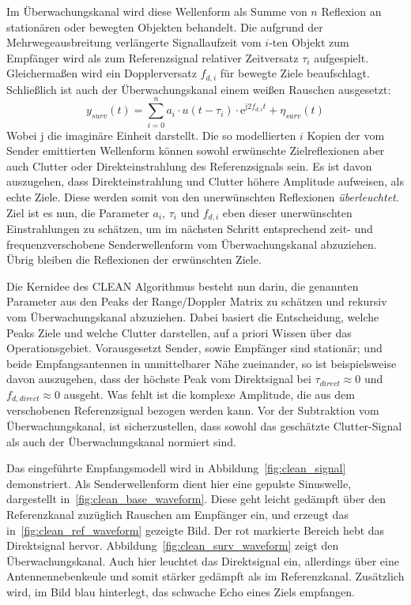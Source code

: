 Im Überwachungskanal wird diese Wellenform als Summe von \(n\) Reflexion an stationären oder bewegten Objekten behandelt. Die aufgrund der Mehrwegeausbreitung verlängerte Signallaufzeit vom \(i\)-ten Objekt zum Empfänger wird als zum Referenzsignal relativer Zeitversatz \(\tau_{i} \) aufgespielt. Gleichermaßen wird ein Dopplerversatz \(f_{d,i}\) für bewegte Ziele beaufschlagt. Schließlich ist auch der Überwachungskanal einem weißen Rauschen ausgesetzt:%
%
\begin{equation}
    y_{surv} (t) = \sum_{i = 0}^{n}{a_{i} \cdot u (t - \tau_{i}) \cdot \mathrm{e}^{\mathrm{j} 2 f_{d,i} t}} + \eta_{surv} (t)
\end{equation}%
%
Wobei \(\mathrm{j}\) die imaginäre Einheit darstellt. Die so modellierten \(i\) Kopien der vom Sender emittierten Wellenform können sowohl erwünschte Zielreflexionen aber auch Clutter oder Direkteinstrahlung des Referenzsignals sein. Es ist davon auszugehen, dass Direkteinstrahlung und Clutter höhere Amplitude aufweisen, als echte Ziele. Diese werden somit von den unerwünschten Reflexionen \emph{überleuchtet}. Ziel ist es nun, die Parameter \(a_{i}\), \(\tau_{i}\) und \(f_{d,i}\) eben dieser unerwünschten Einstrahlungen zu schätzen, um im nächsten Schritt entsprechend zeit- und frequenzverschobene Senderwellenform vom Überwachungskanal abzuziehen. Übrig bleiben die Reflexionen der erwünschten Ziele.

Die Kernidee des CLEAN Algorithmus besteht nun darin, die genannten Parameter aus den Peaks der Range/Doppler Matrix zu schätzen und rekursiv vom Überwachungskanal abzuziehen. Dabei basiert die Entscheidung, welche Peaks Ziele und welche Clutter darstellen, auf a priori Wissen über das Operationsgebiet. Vorausgesetzt Sender, sowie Empfänger sind stationär; und beide Empfangsantennen in unmittelbarer Nähe zueinander, so ist beispielsweise davon auszugehen, dass der höchste Peak vom Direktsignal bei \(\tau_{direct} \approx 0\) und \(f_{d,direct} \approx 0\) ausgeht. Was fehlt ist die komplexe Amplitude, die aus dem verschobenen Referenzsignal bezogen werden kann. Vor der Subtraktion vom Überwachungskanal, ist sicherzustellen, dass sowohl das geschätzte Clutter-Signal als auch der Überwachungskanal normiert sind.

Das eingeführte Empfangsmodell wird in Abbildung~\ref{fig:clean_signal} demonstriert. Als Senderwellenform dient hier eine gepulste Sinuswelle, dargestellt in~\ref{fig:clean_base_waveform}. Diese geht leicht gedämpft über den Referenzkanal zuzüglich Rauschen am Empfänger ein, und erzeugt das in~\ref{fig:clean_ref_waveform} gezeigte Bild. Der rot markierte Bereich hebt das Direktsignal hervor. Abbildung~\ref{fig:clean_surv_waveform} zeigt den Überwachungskanal. Auch hier leuchtet das Direktsignal ein, allerdings über eine Antennennebenkeule und somit stärker gedämpft als im Referenzkanal. Zusätzlich wird, im Bild blau hinterlegt, das schwache Echo eines Ziels empfangen.

